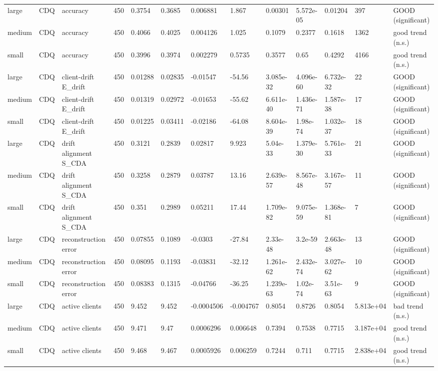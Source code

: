 \begin{table}[t]
\begin{tabular}{lllllllllllll}
large & CDQ & accuracy & 450 & 0.3754 & 0.3685 & 0.006881 & 1.867 & 0.00301 & 5.572e-05 & 0.01204 & 397 & GOOD (significant) \\
medium & CDQ & accuracy & 450 & 0.4066 & 0.4025 & 0.004126 & 1.025 & 0.1079 & 0.2377 & 0.1618 & 1362 & good trend (n.s.) \\
small & CDQ & accuracy & 450 & 0.3996 & 0.3974 & 0.002279 & 0.5735 & 0.3577 & 0.65 & 0.4292 & 4166 & good trend (n.s.) \\
large & CDQ & client-drift E\_drift & 450 & 0.01288 & 0.02835 & -0.01547 & -54.56 & 3.085e-32 & 4.096e-60 & 6.732e-32 & 22 & GOOD (significant) \\
medium & CDQ & client-drift E\_drift & 450 & 0.01319 & 0.02972 & -0.01653 & -55.62 & 6.611e-40 & 1.436e-71 & 1.587e-38 & 17 & GOOD (significant) \\
small & CDQ & client-drift E\_drift & 450 & 0.01225 & 0.03411 & -0.02186 & -64.08 & 8.604e-39 & 1.98e-74 & 1.032e-37 & 18 & GOOD (significant) \\
large & CDQ & drift alignment S\_CDA & 450 & 0.3121 & 0.2839 & 0.02817 & 9.923 & 5.04e-33 & 1.379e-30 & 5.761e-33 & 21 & GOOD (significant) \\
medium & CDQ & drift alignment S\_CDA & 450 & 0.3258 & 0.2879 & 0.03787 & 13.16 & 2.639e-57 & 8.567e-48 & 3.167e-57 & 11 & GOOD (significant) \\
small & CDQ & drift alignment S\_CDA & 450 & 0.351 & 0.2989 & 0.05211 & 17.44 & 1.709e-82 & 9.075e-59 & 1.368e-81 & 7 & GOOD (significant) \\
large & CDQ & reconstruction error & 450 & 0.07855 & 0.1089 & -0.0303 & -27.84 & 2.33e-48 & 3.2e-59 & 2.663e-48 & 13 & GOOD (significant) \\
medium & CDQ & reconstruction error & 450 & 0.08095 & 0.1193 & -0.03831 & -32.12 & 1.261e-62 & 2.432e-74 & 3.027e-62 & 10 & GOOD (significant) \\
small & CDQ & reconstruction error & 450 & 0.08383 & 0.1315 & -0.04766 & -36.25 & 1.239e-63 & 1.02e-74 & 3.51e-63 & 9 & GOOD (significant) \\
large & CDQ & active clients & 450 & 9.452 & 9.452 & -0.0004506 & -0.004767 & 0.8054 & 0.8726 & 0.8054 & 5.813e+04 & bad trend (n.s.) \\
medium & CDQ & active clients & 450 & 9.471 & 9.47 & 0.0006296 & 0.006648 & 0.7394 & 0.7538 & 0.7715 & 3.187e+04 & good trend (n.s.) \\
small & CDQ & active clients & 450 & 9.468 & 9.467 & 0.0005926 & 0.006259 & 0.7244 & 0.711 & 0.7715 & 2.838e+04 & good trend (n.s.) \\

\end{tabular}
\end{table}
